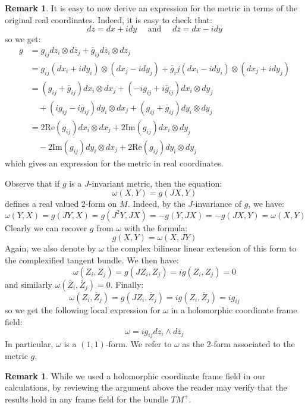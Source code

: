 \documentclass[11pt]{amsart}
\theoremstyle{definition}
\newtheorem{remark}[subsection]{Remark}
\def \Re{ \text{Re} }
\def \Im{ \text{Im} }
\begin{document}
\begin{remark}  It is easy to now derive an expression for the metric in terms of the original real coordinates.  Indeed, it is easy to check that:
%
$$ d z = dx + i dy \quad \text{ and } \quad d \bar{z} = dx - i dy $$
%
so we get:
%
\begin{align*}
g &= g_{ij} dz_i \otimes d \bar{z}_j + \bar{g}_{ij} d \bar{z}_i \otimes d z_j \\
&= g_{ij} ( dx_i + i dy_i ) \otimes ( d x_j - i d y_j ) + \bar{g}_ij (  d x_i - i d y_i  ) \otimes ( dx_j + i dy_j ) \\
%
&= ( g_{ij} + \bar{g}_{ij} ) dx_i \otimes dx_j + ( - i g_{ij} + i \bar{g}_{ij} ) dx_i \otimes dy_j \\
& \quad + ( i g_{ij} - i \bar{g}_{ij} ) dy_i \otimes dx_j + ( g_{ij} + \bar{g}_{ij} ) dy_i \otimes dy_j \\
%
&= 2 \Re (g_{ij}) dx_i \otimes dx_j + 2 \Im( g_{ij} ) dx_i \otimes dy_j \\
& \quad - 2 \Im( g_{ij} ) dy_i \otimes dx_j + 2 \Re ( g_{ij} ) dy_i \otimes dy_j
\end{align*}
%
which gives an expression for the metric in real coordinates.
\end{remark}

Observe that if $g$ is a $J$-invariant metric, then the equation:
%
$$\omega(X,Y) = g(JX, Y)$$
%
defines a real valued 2-form on $M$. Indeed, by the $J$-invariance of $g$, we have:
%
$$ \omega(Y,X) = g(JY, X) = g( J^2 Y, JX ) = - g( Y, JX ) = - g( JX, Y ) = \omega( X, Y ) $$
%
Clearly we can recover $g$ from $\omega$ with the formula:
%
$$ g(X,Y) = \omega(X,JY) $$
%
Again, we also denote by $\omega$ the complex bilinear linear extension of this form to the complexified tangent bundle.  We then have:
%
$$ \omega( Z_i, Z_j ) = g( J Z_i, Z_j ) = i g( Z_i, Z_j ) = 0 $$
%
and similarly $ \omega( \bar{Z}_i, \bar{Z}_j ) = 0 $.  Finally:
%
$$ \omega( Z_i, \bar{Z}_j ) = g( J Z_i, \bar{Z}_j ) = i g( Z_i, \bar{Z}_j ) = i g_{ij} $$
%
so we get the following local expression for $\omega$ in a holomorphic coordinate frame field:
%
$$ \omega = i g_{ij} d z_i \wedge d \bar{z}_j $$
%
In particular, $\omega$ is a $(1,1)$-form. We refer to $\omega$ as the 2-form associated to the metric $g$.

\begin{remark}
While we used a holomorphic coordinate frame field in our calculations, by reviewing the argument above the reader may verify that the results hold in any frame field for the bundle $TM^{+}$.
\end{remark}
\end{document}

